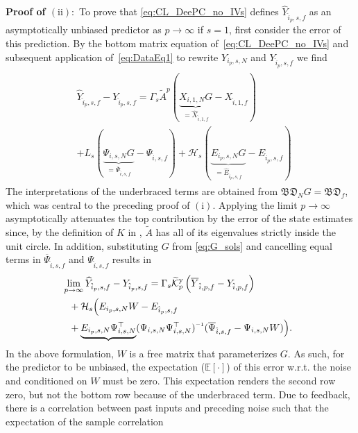 \noindent\textbf{Proof of $\mathrm{(ii)}:$} To prove that \eqref{eq:CL_DeePC_no_IVs} defines $\widehat{Y}_{\hat{i}_p,s,f}$ as an asymptotically unbiased predictor as $p\rightarrow\infty$ if $s=1$, first consider the error of this prediction. By the bottom matrix equation of~\eqref{eq:CL_DeePC_no_IVs} and subsequent application of~\eqref{eq:DataEq1} to rewrite $Y_{i_p,s,N}$ and $Y_{\hat{i}_p,s,f}$ we find
\begin{align}%
    \begin{split}
        &\!\!\!\widehat{Y}_{\hat{i}_p,s,f}-Y_{\hat{i}_p,s,f} = \Gamma_s \tilde{A}^p (\underbrace{X_{i,1,N}G}_{=\widehat{X}_{\hat{i},1,f}}-X_{\hat{i},1,f}) \\
        &+L_s(\underbrace{\Psi_{i,s,N}G}_{=\overline{\Psi}_{\hat{i},s,f}}-\Psi_{\hat{i},s,f}) +\mathcal{H}_s (\underbrace{E_{i_p,s,N}G}_{=\widehat{E}_{\hat{i}_p,s,f}}-E_{\hat{i}_p,s,f})
    \end{split}
\end{align}
The interpretations of the underbraced terms are obtained from $\mathfrak{BD}_N G=\mathfrak{BD}_f$, which was central to the preceding proof of $\mathrm{(i)}$. Applying the limit $p\rightarrow\infty$ asymptotically attenuates the top contribution by the error of the state estimates since, by the definition of $K$ in , $\tilde{A}$ has all of its eigenvalues strictly inside the unit circle. In addition, substituting $G$ from \eqref{eq:G_sols} and cancelling equal terms in $\overline{\Psi}_{\hat{i},s,f}$ and $\Psi_{\hat{i},s,f}$ results in
\begin{alignat}{2}
        &\!\!\!\!\lim_{p\rightarrow\infty} \widehat{Y}_{\hat{i}_p,s,f}-Y_{\hat{i}_p,s,f} = \Gamma_s\tKp{y}\left(\overline{Y}_{\hat{i},p,f}-Y_{\hat{i},p,f}\right)\notag\\
        &+\mathcal{H}_s\Big(E_{i_p,s,N} W-E_{\hat{i}_p,s,f}\\%
        &+\underbrace{E_{i_p,s,N}\Psi_{i,s,N}^\top}(\Psi_{i,s,N}\Psi_{i,s,N}^\top)\inv(\overline{\Psi}_{\hat{i},s,f}-\Psi_{i,s,N}W)\Big)\notag.
\end{alignat}%
In the above formulation, $W$ is a free matrix that parameterizes $G$. As such, for the predictor to be unbiased, the expectation ($\mathbb{E}[\cdot]$) of this error w.r.t. the noise and conditioned on $W$ must be zero.  This expectation renders the second row zero, but not the bottom row because of the underbraced term. Due to feedback, there is a correlation between past inputs and preceding noise such that the expectation of the sample correlation
